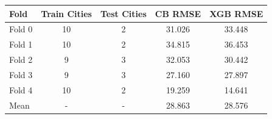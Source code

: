 \begin{tabular}{lcccc}
\toprule
Fold & Train Cities & Test Cities & CB RMSE & XGB RMSE \\ \midrule
Fold 0 & 10 & 2 & 31.026 & 33.448 \\
Fold 1 & 10 & 2 & 34.815 & 36.453 \\
Fold 2 & 9 & 3 & 32.053 & 30.442 \\
Fold 3 & 9 & 3 & 27.160 & 27.897 \\
Fold 4 & 10 & 2 & 19.259 & 14.641 \\
Mean & - & - & 28.863 & 28.576 \\
\bottomrule
\end{tabular}
